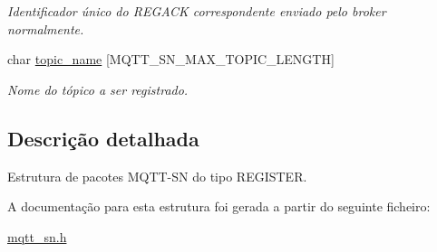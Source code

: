 \begin{DoxyCompactItemize}
\begin{DoxyCompactList}\small\item\em Identificador único do R\+E\+G\+A\+C\+K correspondente enviado pelo broker normalmente. \end{DoxyCompactList}\item 
\hypertarget{structregister__packet__t_a4928dc5635290abe481ce340f6d47865}{char \hyperlink{structregister__packet__t_a4928dc5635290abe481ce340f6d47865}{topic\+\_\+name} \mbox{[}M\+Q\+T\+T\+\_\+\+S\+N\+\_\+\+M\+A\+X\+\_\+\+T\+O\+P\+I\+C\+\_\+\+L\+E\+N\+G\+T\+H\mbox{]}}\label{structregister__packet__t_a4928dc5635290abe481ce340f6d47865}

\begin{DoxyCompactList}\small\item\em Nome do tópico a ser registrado. \end{DoxyCompactList}\end{DoxyCompactItemize}


\subsection{Descrição detalhada}
Estrutura de pacotes M\+Q\+T\+T-\/\+S\+N do tipo R\+E\+G\+I\+S\+T\+E\+R. 

A documentação para esta estrutura foi gerada a partir do seguinte ficheiro\+:\begin{DoxyCompactItemize}
\item 
\hyperlink{mqtt__sn_8h}{mqtt\+\_\+sn.\+h}\end{DoxyCompactItemize}
